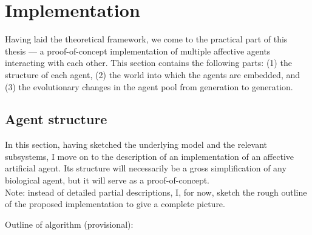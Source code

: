 \documentclass[]{scrartcl}
\theoremstyle{break}
\begin{document}
\section{Implementation}

Having laid the theoretical framework, we come to the practical part of this thesis --- a proof-of-concept implementation of multiple affective agents interacting with each other. This section contains the following parts: (1) the structure of each agent, (2) the world into which the agents are embedded, and (3) the evolutionary changes in the agent pool from generation to generation.

\subsection{Agent structure}

In this section, having sketched the underlying model and the relevant subsystems, I move on to the description of an implementation of an affective artificial agent. Its structure will necessarily be a gross simplification of any biological agent, but it will serve as a proof-of-concept.\\

\noindent
Note: instead of detailed partial descriptions, I, for now, sketch the rough outline of the proposed implementation to give a complete picture.

Outline of algorithm (provisional):
\end{document}
